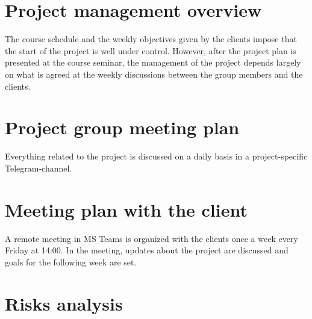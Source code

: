 \section{Project management overview}

The course schedule and the weekly objectives given by the clients impose that the start of the project is well
under control. However, after the project plan is presented at the course seminar, the management of the project
depends largely on what is agreed at the weekly discussions between the group members and the clients.


\section{Project group meeting plan}

Everything related to the project is discussed on a daily basis in a project-specific Telegram-channel.


\section{Meeting plan with the client}

A remote meeting in MS Teams is organized with the clients once a week every Friday at 14:00. In the meeting,
updates about the project are discussed and goals for the following week are set.


\section{Risks analysis}

